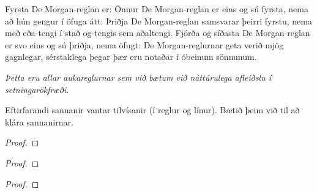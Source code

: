 Fyrsta De Morgan-reglan er:
Önnur De Morgan-reglan er eins og sú fyrsta, nema að hún gengur í öfuga átt:
Þriðja De Morgan-reglan samsvarar þeirri fyrstu, nema með eða-tengi í stað og-tengis sem aðaltengi.
Fjórða og síðasta De Morgan-reglan er svo eins og sú þriðja, nema öfugt:
De Morgan-reglurnar geta verið mjög gagnlegar, sérstaklega þegar þær eru notaðar í óbeinum sönnunum.

\emph{Þetta eru allar aukareglurnar sem við bætum við náttúrulega afleiðslu í setningarökfræði}.	

\practiceproblems
\problempart
\label{pr.justifyTFLproof}
Eftirfarandi sannanir vantar tilvísanir (í reglur og línur). Bætið þeim við til að klára sannanirnar.
\begin{multicols}{2}
\begin{proof}
 {}
 {}
\end{proof}
\vfill
\begin{proof}
\open
\close
{}
\end{proof}
\columnbreak
\begin{proof}
\open
	 {}
		\open
	\close
\close
{}
\end{proof}
\end{multicols}

